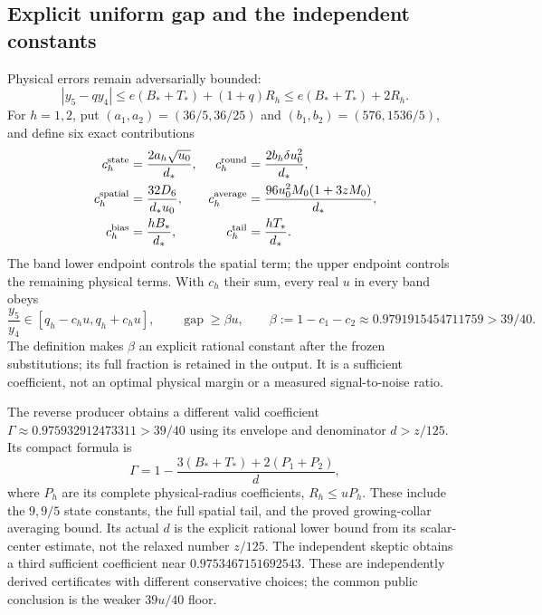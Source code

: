\subsection{Explicit uniform gap and the independent constants}
Physical errors remain adversarially bounded:
\begin{equation}
 |y_5-qy_4|\le e(B_*+T_*)+(1+q)R_h
 \le e(B_*+T_*)+2R_h.
 \label{eq:ai4-full-numerator}
\end{equation}
For $h=1,2$, put $(a_1,a_2)=(36/5,36/25)$ and $(b_1,b_2)=(576,1536/5)$, and define six exact contributions
\begin{align}
 c_h^{\rm state}&=\frac{2a_h\sqrt{u_0}}{d_*},&
 c_h^{\rm round}&=\frac{2b_h\delta u_0^2}{d_*},\notag\\
 c_h^{\rm spatial}&=\frac{32D_6}{d_*u_0},&
 c_h^{\rm average}&=\frac{96u_0^2M_0(1+3zM_0)}{d_*},\notag\\
 c_h^{\rm bias}&=\frac{hB_*}{d_*},&
 c_h^{\rm tail}&=\frac{hT_*}{d_*}.
 \label{eq:ai4-radius-coefficients}
\end{align}
The band lower endpoint controls the spatial term; the upper endpoint controls the remaining physical terms. With $c_h$ their sum, every real $u$ in every band obeys
\begin{equation}
 \frac{y_5}{y_4}\in[q_h-c_hu,q_h+c_hu],\qquad
 \operatorname{gap}\ge\beta u,\qquad
 \beta:=1-c_1-c_2\approx0.9791915454711759>39/40.
 \label{eq:ai4-uniform-result}
\end{equation}
The definition makes $\beta$ an explicit rational constant after the frozen substitutions; its full fraction is retained in the output. It is a sufficient coefficient, not an optimal physical margin or a measured signal-to-noise ratio.

The reverse producer obtains a different valid coefficient $\Gamma\approx0.975932912473311>39/40$ using its envelope and denominator $d>z/125$. Its compact formula is
\begin{equation}
 \Gamma=1-\frac{3(B_*+T_*)+2(P_1+P_2)}{d},
 \label{eq:ai4-reverse-constant}
\end{equation}
where $P_h$ are its complete physical-radius coefficients, $R_h\le uP_h$. These include the $9,9/5$ state constants, the full spatial tail, and the proved growing-collar averaging bound. Its actual $d$ is the explicit rational lower bound from its scalar-center estimate, not the relaxed number $z/125$. The independent skeptic obtains a third sufficient coefficient near $0.9753467151692543$. These are independently derived certificates with different conservative choices; the common public conclusion is the weaker $39u/40$ floor.

